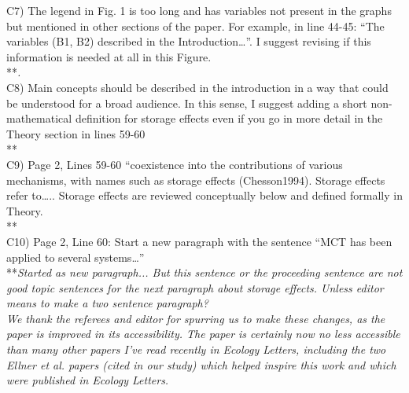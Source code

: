 \documentclass[letterpaper,11pt]{article}
\begin{document}
\noindent C7) The legend in Fig. 1 is too long and has variables not present in the graphs but mentioned in other sections of the paper. For example, in line 44-45: “The variables (B1, B2) described in the Introduction…”. I suggest revising if this information is needed at all in this Figure. \\

\noindent ***\emph{. } \\


\noindent C8) Main concepts should be described in the introduction in a way that could be understood for a broad audience. In this sense, I suggest adding a short non- mathematical definition for storage effects even if you go in more detail in the Theory section in lines 59-60 \\

\noindent ***\emph{} \\

\noindent C9) Page 2, Lines 59-60 “coexistence into the contributions of various mechanisms, with names such as storage effects (Chesson1994). Storage effects refer to….. Storage effects are reviewed conceptually below and defined formally in Theory. \\  

\noindent ***\emph{} \\

\noindent C10)  Page 2, Line 60: Start a new paragraph with the sentence “MCT has been applied to several systems…” \\

\noindent ***\emph{Started as new paragraph... But this sentence or the proceeding sentence are not good topic sentences for the next paragraph about storage effects. Unless editor means to make a two sentence paragraph?} \\

\emph{We thank the referees and editor for spurring us to make these changes, as the paper is improved in
its accessibility. The paper is certainly now no less accessible than many other papers I've read recently in 
Ecology Letters, including the two Ellner et al. papers (cited in our study) which helped inspire this 
work and which were published in Ecology Letters.} 
\end{document}
